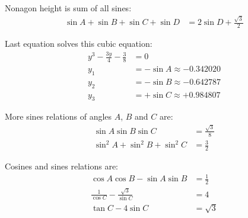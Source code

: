 \documentclass[11pt]{article}
\begin{document}
Nonagon height is sum of all sines:
\begin{align}
\sin{A}+\sin{B}+\sin{C}+\sin{D} &= 2\sin{D} + \frac{\sqrt{3}}{2}
\end{align}



Last equation solves this cubic equation:
\begin{align*}
y^3 - \frac{3y}{4} - \frac{3}{8} &= 0\\
y_1 &= -\sin{A} \approx -0.342020\\
y_2 &= -\sin{B} \approx -0.642787\\
y_3 &= +\sin{C} \approx +0.984807
\end{align*}

More sines relations of angles $A$, $B$ and $C$ are:
\begin{align*}
\sin{A}\sin{B}\sin{C} &= \frac{\sqrt{3}}{8}\\
\sin^2{A} + \sin^2{B} + \sin^2{C} &= \frac{3}{2}
\end{align*}

Cosines and sines relations are:
\begin{align*}
\cos{A}\cos{B} - \sin{A}\sin{B} &= \frac{1}{2}\\
\frac{1}{\cos{C}} -\frac{\sqrt{3}}{\sin{C}} &= 4\\
\tan{C} - 4\sin{C} &= \sqrt{3}
\end{align*}
\end{document}
